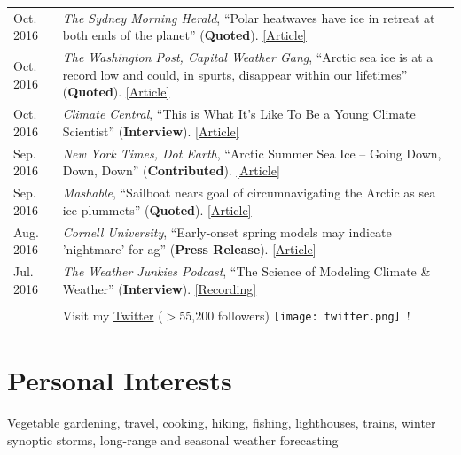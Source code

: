 \documentclass[margin,line,palatino,courier,10pt]{res}
\begin{document}
\begin{resume}
\begin{tabular}{@{}p{0.9in}p{4in}}
Oct. 2016 & \textit{The Sydney Morning Herald}, ``Polar heatwaves have ice in retreat at both ends of the planet'' (\textbf{Quoted}). \href{http://www.smh.com.au/environment/climate-change/polar-heatwaves-have-ice-in-retreat-at-both-ends-of-the-planet-20161030-gse9q6.html}{[Article]}\\
Oct. 2016 & \textit{The Washington Post, Capital Weather Gang}, ``Arctic sea ice is at a record low and could, in spurts, disappear within our lifetimes'' (\textbf{Quoted}). \href{https://www.washingtonpost.com/news/capital-weather-gang/wp/2016/10/27/arctic-sea-ice-is-at-a-record-low-and-could-in-spurts-disappear-within-our-lifetimes/}{[Article]}\\
Oct. 2016 & \textit{Climate Central}, ``This is What It's Like To Be a Young Climate Scientist'' (\textbf{Interview}). \href{http://www.climatecentral.org/news/young-climate-scientists-interviews-20799}{[Article]}\\
Sep. 2016 & \textit{New York Times, Dot Earth}, ``Arctic Summer Sea Ice -- Going Down, Down, Down'' (\textbf{Contributed}). \href{http://dotearth.blogs.nytimes.com/2016/09/16/arctic-summer-sea-ice-going-down-down-down/?module=BlogPost-ReadMore&version=Blog\%20Main&action=Click&contentCollection=arctic&pgtype=Blogs&region=Body&_r=1#more-58318}{[Article]}\\
Sep. 2016 & \textit{Mashable}, ``Sailboat nears goal of circumnavigating the Arctic as sea ice plummets'' (\textbf{Quoted}). \href{http://mashable.com/2016/09/01/sailboat-arctic-ice-melt-open-water/#s7nzft8m6sqB}{[Article]}\\
Aug. 2016 & \textit{Cornell University}, ``Early-onset spring models may indicate 'nightmare' for ag'' (\textbf{Press Release}). \href{http://www.news.cornell.edu/stories/2016/08/early-onset-spring-models-may-indicate-nightmare-ag}{[Article]}\\
Jul. 2016 & \textit{The Weather Junkies Podcast}, ``The Science of Modeling Climate \& Weather'' (\textbf{Interview}). \href{https://www.youtube.com/watch?v=vgT5P9zC91U}{[Recording]}\\\\

& Visit my \href{https://twitter.com/ZLabe}{Twitter} ($>$55,200 followers) \texttt{[image: twitter.png]}\ !\\
\end{tabular}

\vspace{-0.1in}
\noindent\textcolor{Cerulean}{\makebox[\linewidth][r]{\rule{\textwidth}{5pt}}}
\vspace{-0.3in}
\section{\sc \textcolor{Cerulean}{\large{\textbf{Personal Interests}}}}
Vegetable gardening, travel, cooking, hiking, fishing, lighthouses, trains, winter synoptic storms, long-range and seasonal weather forecasting

\end{resume}
\end{document}
